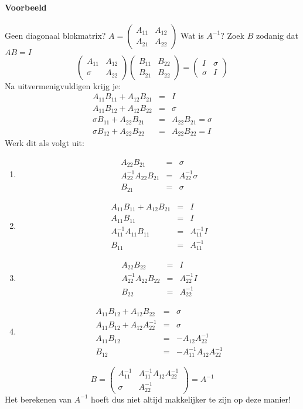 \paragraph{Voorbeeld} Geen diagonaal blokmatrix?
$A = \begin{pmatrix} A_{11} & A_{12} \\
A_{21} & A_{22} \end{pmatrix}$ Wat is $A^{-1}$? Zoek $B$ zodanig dat $AB=I$
\[\begin{pmatrix} A_{11} & A_{12} \\
\sigma & A_{22} \end{pmatrix} \begin{pmatrix} B_{11} & B_{22} \\
B_{21} & B_{22} \end{pmatrix} = \begin{pmatrix}
I & \sigma \\ \sigma & I \end{pmatrix} \]
Na uitvermenigvuldigen krijg je:
\begin{eqnarray*}
	A_{11}B_{11} + A_{12}B_{21} &=& I \\
	A_{11}B_{12} + A_{12}B_{22} &=& \sigma \\
	\sigma B_{11} + A_{22}B_{21} &=& A_{22}B_{21} = \sigma \\
	\sigma B_{12} + A_{22}B_{22} &=& A_{22}B_{22} = I
\end{eqnarray*}
Werk dit als volgt uit:
\begin{enumerate}
	\item \begin{eqnarray*}
		A_{22}B_{21} &=& \sigma \\
		A_{22}^{-1}A_{22}B_{21} &=& A_{22}^{-1} \sigma \\
		B_{21} &=& \sigma
	\end{eqnarray*}
	
	\item \begin{eqnarray*}
		A_{11}B_{11} + A_{12}B_{21} &=& I \\
		A_{11}B_{11} &=& I \\
		A_{11}^{-1}A_{11}B_{11} &=& A_{11}^{-1}I \\
		B_{11} &=& A_{11}^{-1}
	\end{eqnarray*}
	
	\item \begin{eqnarray*}
		A_{22}B_{22} &=& I \\
		A_{22}^{-1}A_{22}B_{22} &=& A_{22}^{-1}I \\
		B_{22} &=& A_{22}^{-1}
	\end{eqnarray*}
	
	\item \begin{eqnarray*}
		A_{11}B_{12} + A_{12}B_{22} &=& \sigma \\
		A_{11}B_{12} + A_{12}A_{22}^{-1} &=& \sigma \\
		A_{11}B_{12} &=& -A_{12}A_{22}^{-1} \\
		B_{12} &=& -A_{11}^{-1}A_{12}A_{22}^{-1}
	\end{eqnarray*}
\end{enumerate}
\[ B = \begin{pmatrix} A_{11}^{-1} & A_{11}^{-1}A_{12}A_{22}^{-1} \\
\sigma & A_{22}^{-1} \end{pmatrix} = A^{-1} \]
Het berekenen van $A^{-1}$ hoeft dus niet altijd makkelijker te zijn op deze manier!